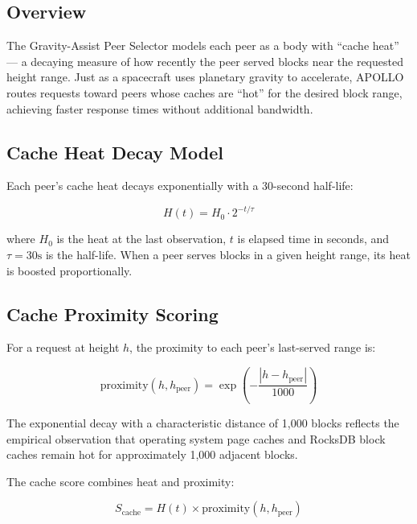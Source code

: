 \documentclass[11pt,a4paper]{article}
\begin{document}
\subsection{Overview}

The Gravity-Assist Peer Selector models each peer as a body with ``cache heat'' --- a decaying measure of how recently the peer served blocks near the requested height range. Just as a spacecraft uses planetary gravity to accelerate, APOLLO routes requests toward peers whose caches are ``hot'' for the desired block range, achieving faster response times without additional bandwidth.

\subsection{Cache Heat Decay Model}

Each peer's cache heat decays exponentially with a 30-second half-life:

\begin{equation}
H(t) = H_0 \cdot 2^{-t/\tau}
\label{eq:heat_decay}
\end{equation}

where $H_0$ is the heat at the last observation, $t$ is elapsed time in seconds, and $\tau = 30\text{s}$ is the half-life. When a peer serves blocks in a given height range, its heat is boosted proportionally.

\subsection{Cache Proximity Scoring}

For a request at height $h$, the proximity to each peer's last-served range is:

\begin{equation}
\text{proximity}(h, h_{\text{peer}}) = \exp\!\left(-\frac{|h - h_{\text{peer}}|}{1000}\right)
\label{eq:proximity}
\end{equation}

The exponential decay with a characteristic distance of 1,000 blocks reflects the empirical observation that operating system page caches and RocksDB block caches remain hot for approximately 1,000 adjacent blocks.

The cache score combines heat and proximity:

\begin{equation}
S_{\text{cache}} = H(t) \times \text{proximity}(h, h_{\text{peer}})
\label{eq:cache_score}
\end{equation}
\end{document}
